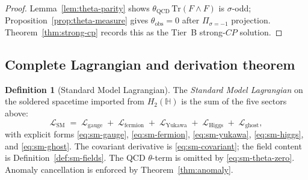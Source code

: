 \documentclass[11pt]{article}
\theoremstyle{plain}
\theoremstyle{definition}
\newtheorem{definition}[theorem]{Definition}
\theoremstyle{remark}
\numberwithin{equation}{section}
\newcommand{\Quat}{\mathbb{H}}
\begin{document}
\begin{proof}
Lemma~\ref{lem:theta-parity} shows $\theta_{\mathrm{QCD}}\,
\mathrm{Tr}(F\wedge F)$ is $\sigma$-odd; Proposition~\ref{prop:theta-measure}
gives $\theta_{\mathrm{obs}}=0$ after $\Pi_{\sigma=-1}$ projection.
Theorem~\ref{thm:strong-cp} records this as the Tier~B strong-$CP$ solution.
\end{proof}

\subsection{Complete Lagrangian and derivation theorem}
\label{sec:sm-lagrangian:complete}

\begin{definition}[Standard Model Lagrangian]\label{def:sm-lagrangian}
The \emph{Standard Model Lagrangian} on the soldered spacetime imported from
$H_2(\Quat)$ is the sum of the five sectors above:
\begin{equation}\label{eq:sm-lagrangian}
  \mathcal{L}_{\mathrm{SM}}
  \;=\;
  \mathcal{L}_{\mathrm{gauge}}
  \;+\;
  \mathcal{L}_{\mathrm{fermion}}
  \;+\;
  \mathcal{L}_{\mathrm{Yukawa}}
  \;+\;
  \mathcal{L}_{\mathrm{Higgs}}
  \;+\;
  \mathcal{L}_{\mathrm{ghost}},
\end{equation}
with explicit forms \eqref{eq:sm-gauge}, \eqref{eq:sm-fermion},
\eqref{eq:sm-yukawa}, \eqref{eq:sm-higgs}, and \eqref{eq:sm-ghost}. The
covariant derivative is \eqref{eq:sm-covariant}; the field content is
Definition~\ref{def:sm-fields}. The QCD $\theta$-term is omitted by
\eqref{eq:sm-theta-zero}. Anomaly cancellation is enforced by
Theorem~\ref{thm:anomaly}.
\end{definition}
\end{document}

